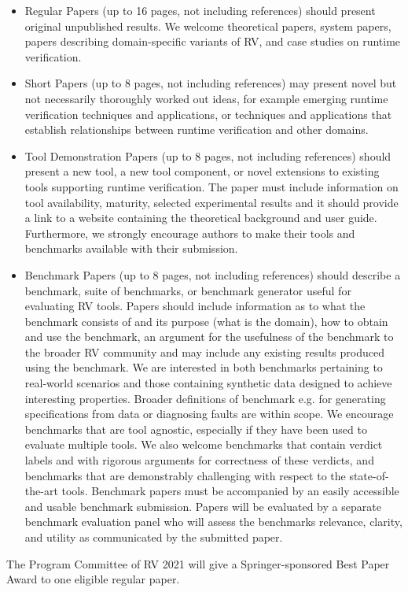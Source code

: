 \documentclass[prodmode,acmtecs]{acmsmall} %
\begin{document}
\begin{itemize}
\begin{itemize}\item  Regular Papers (up to 16 pages, not including references) should present original unpublished results. We welcome theoretical papers, system papers, papers describing domain-specific variants of RV, and case studies on runtime verification.
\item  Short Papers (up to 8 pages, not including references) may present novel but not necessarily thoroughly worked out ideas, for example emerging runtime verification techniques and applications, or techniques and applications that establish relationships between runtime verification and other domains.
\item  Tool Demonstration Papers (up to 8 pages, not including references) should present a new tool, a new tool component, or novel extensions to existing tools supporting runtime verification. The paper must include information on tool availability, maturity, selected experimental results and it should provide a link to a website containing the theoretical background and user guide. Furthermore, we strongly encourage authors to make their tools and benchmarks available with their submission.
\item  Benchmark Papers (up to 8 pages, not including references) should describe a benchmark, suite of benchmarks, or benchmark generator useful for evaluating RV tools. Papers should include information as to what the benchmark consists of and its purpose (what is the domain), how to obtain and use the benchmark, an argument for the usefulness of the benchmark to the broader RV community and may include any existing results produced using the benchmark. We are interested in both benchmarks pertaining to real-world scenarios and those containing synthetic data designed to achieve interesting properties. Broader definitions of benchmark e.g. for generating specifications from data or diagnosing faults are within scope. We encourage benchmarks that are tool agnostic, especially if they have been used to evaluate multiple tools. We also welcome benchmarks that contain verdict labels and with rigorous arguments for correctness of these verdicts, and benchmarks that are demonstrably challenging with respect to the state-of-the-art tools. Benchmark papers must be accompanied by an easily accessible and usable benchmark submission. Papers will be evaluated by a separate benchmark evaluation panel who will assess the benchmarks relevance, clarity, and utility as communicated by the submitted paper.
\end{itemize} 
  The Program Committee of RV 2021 will give a Springer-sponsored Best Paper Award to one eligible regular paper. 
 

\end{itemize}
\end{document}
